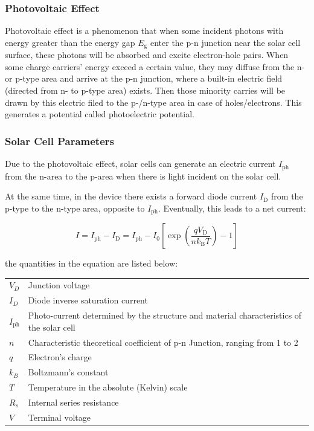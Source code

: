 \documentclass{article}
\begin{document}
\subsubsection{Photovoltaic Effect}
Photovoltaic effect is a phenomenon that when some incident photons with energy greater than the energy gap $E_{\mathrm{g}}$ enter the p-n junction near the solar cell surface, these photons will be absorbed and excite electron-hole pairs. When some charge carriers' energy exceed a certain value, they may diffuse from the n- or p-type area and arrive at the p-n junction, where a built-in electric field (directed from n- to p-type area) exists. Then those minority carries will be drawn by this electric filed to the p-/n-type area in case of holes/electrons. This generates a potential called photoelectric potential.

\subsubsection{Solar Cell Parameters}
Due to the photovoltaic effect, solar cells can generate an electric current $I_{\mathrm{ph}}$ from the n-area to the p-area when there is light incident on the solar cell.

At the same time, in the device there exists a forward diode current $I_{\mathrm{D}}$ from the p-type to the n-type area, opposite to $I_{\mathrm{ph}}$. Eventually, this leads to a net current:

\begin{equation}
I=I_{\mathrm{ph}}-I_{\mathrm{D}}=I_{\mathrm{ph}}-I_{0}\left[\exp \left(\frac{q V_{\mathrm{D}}}{n k_{\mathrm{B}} T}\right)-1\right]
\end{equation}

the quantities in the equation are listed below:

\begin{table}[H]
\centering
\begin{tabular}{ll}
$V_D$ & Junction voltage \\
$I_D$ & Diode inverse saturation current \\
$I_{\mathrm{ph}}$ & Photo-current determined by the structure and material characteristics of the solar cell \\
$n$ & Characteristic theoretical coefficient of p-n Junction, ranging from 1 to 2 \\
$q$ & Electron's charge \\
$k_B$ & Boltzmann's constant \\
$T$ & Temperature in the absolute (Kelvin) scale \\
$R_s$ & Internal series resistance \\
$V$ & Terminal voltage \\
\end{tabular}
\end{table}
\end{document}
